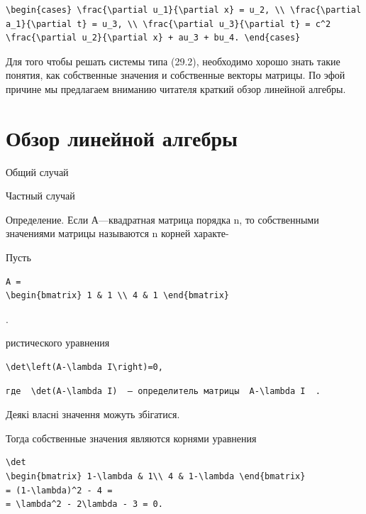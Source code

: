 \documentclass[
  ukrainian,
]{article}
\begin{document}
\begin{verbatim}
\begin{cases} \frac{\partial u_1}{\partial x} = u_2, \\ \frac{\partial a_1}{\partial t} = u_3, \\ \frac{\partial u_3}{\partial t} = c^2 \frac{\partial u_2}{\partial x} + au_3 + bu_4. \end{cases}
\end{verbatim}

Для того чтобы решать системы типа (29.2), необходимо хорошо знать такие
понятия, как собственные значения и собственные векторы матрицы. По эфой
причине мы предлагаем вниманию читателя краткий обзор линейной алгебры.

\section{Обзор линейной
алгебры}\label{ux43eux431ux437ux43eux440-ux43bux438ux43dux435ux439ux43dux43eux439-ux430ux43bux433ux435ux431ux440ux44b}

Общий случай

Частный случай

Определение. Если А---квадратная матрица порядка n, то собственными
значениями матрицы называются n корней характе-

Пусть

\begin{verbatim}
A =
\begin{bmatrix} 1 & 1 \\ 4 & 1 \end{bmatrix}
\end{verbatim}

.

ристического уравнения

\begin{verbatim}
\det\left(A-\lambda I\right)=0,
\end{verbatim}

\begin{verbatim}
где  \det(A-\lambda I)  — определитель матрицы  A-\lambda I  .
\end{verbatim}

Деякі власні значення можуть збігатися.

Тогда собственные значения являются корнями уравнения

\begin{verbatim}
\det
\begin{bmatrix} 1-\lambda & 1\\ 4 & 1-\lambda \end{bmatrix}
= (1-\lambda)^2 - 4 =
= \lambda^2 - 2\lambda - 3 = 0.
\end{verbatim}
\end{document}
